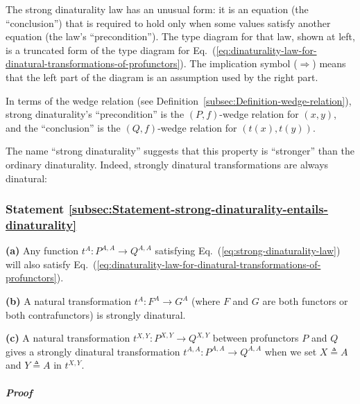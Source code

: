 \noindent The strong dinaturality law has an unusual form: it is an
equation (the \textsf{``}conclusion\textsf{''}) that is required to hold only when
some values satisfy another equation (the law\textsf{'}s \textsf{``}precondition\textsf{''}).
The type diagram for that law, shown at left, is a truncated form
of the type diagram for Eq.~(\ref{eq:dinaturality-law-for-dinatural-transformations-of-profunctors}).
The implication symbol ($\Rightarrow$) means that the left part of
the diagram is an assumption used by the right part.

In terms of the wedge relation (see Definition~\ref{subsec:Definition-wedge-relation}),
strong dinaturality\textsf{'}s \textsf{``}precondition\textsf{''} is the $\left(P,f\right)$-wedge
relation for $(x,y)$, and the \textsf{``}conclusion\textsf{''} is the $\left(Q,f\right)$-wedge
relation for $(t(x),t(y))$.

The name \textsf{``}strong dinaturality\textsf{''} suggests that this property is
\textsf{``}stronger\textsf{''} than the ordinary dinaturality. Indeed, strongly dinatural
transformations are always dinatural:

\subsubsection{Statement \label{subsec:Statement-strong-dinaturality-entails-dinaturality}\ref{subsec:Statement-strong-dinaturality-entails-dinaturality}}

\textbf{(a)} Any function $t^{A}:P^{A,A}\rightarrow Q^{A,A}$ satisfying
Eq.~(\ref{eq:strong-dinaturality-law}) will also satisfy Eq.~(\ref{eq:dinaturality-law-for-dinatural-transformations-of-profunctors}).

\textbf{(b)} A natural transformation $t^{A}:F^{A}\rightarrow G^{A}$
(where $F$ and $G$ are both functors or both contrafunctors) is
strongly dinatural.

\textbf{(c)} A natural transformation $t^{X,Y}:P^{X,Y}\rightarrow Q^{X,Y}$
between profunctors $P$ and $Q$ gives a strongly dinatural transformation
$t^{A,A}:P^{A,A}\rightarrow Q^{A,A}$ when we set $X\triangleq A$
and $Y\triangleq A$ in $t^{X,Y}$.

\subparagraph{Proof}

